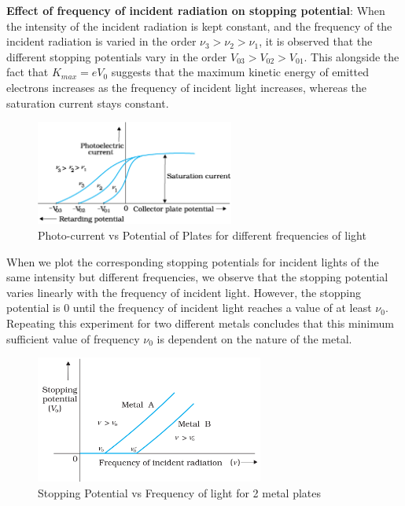 \documentclass{article}
\begin{document}
\newpage

\textbf{Effect of frequency of incident radiation on stopping potential}: When the intensity of the incident radiation is kept constant, and the frequency of the incident radiation is varied in the order $\nu_{3} > \nu_{2} > \nu_{1}$, it is observed that the different stopping potentials vary in the order $V_{03} > V_{02} > V_{01}$. This alongside the fact that $K_{max} = eV_{0}$ suggests that the maximum kinetic energy of emitted electrons increases as the frequency of incident light increases, whereas the saturation current stays constant.

\begin{figure}[htp]
    \centering
    \includegraphics[width=6.5cm]{cr5.png}
    \caption{Photo-current vs Potential of Plates for different frequencies of light}
    \label{fig:galaxy}
    \end{figure}

When we plot the corresponding stopping potentials for incident lights of the same intensity but different frequencies, we observe that the stopping potential varies linearly with the frequency of incident light. However, the stopping potential is 0 until the frequency of incident light reaches a value of at least $\nu_{0}$. Repeating this experiment for two different metals concludes that this minimum sufficient value of frequency $\nu_{0}$ is dependent on the nature of the metal. 

\begin{figure}[htp]
    \centering
    \includegraphics[width=7.5cm]{cr6.png}
    \caption{Stopping Potential vs Frequency of light for 2 metal plates}
    \label{fig:galaxy}
    \end{figure}
\end{document}
